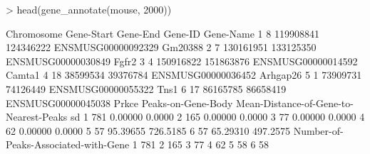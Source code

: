 \documentclass[12pt]{article}
\begin{document}
\begin{Schunk}
\begin{Sinput}
> head(gene_annotate(mouse, 2000))
\end{Sinput}
\begin{Soutput}
  Chromosome Gene-Start  Gene-End            Gene-ID Gene-Name
1          8  119908841 124346222 ENSMUSG00000092329   Gm20388
2          7  130161951 133125350 ENSMUSG00000030849     Fgfr2
3          4  150916822 151863876 ENSMUSG00000014592    Camta1
4         18   38599534  39376784 ENSMUSG00000036452  Arhgap26
5          1   73909731  74126449 ENSMUSG00000055322      Tns1
6         17   86165785  86658419 ENSMUSG00000045038     Prkce
  Peaks-on-Gene-Body Mean-Distance-of-Gene-to-Nearest-Peaks       sd
1                781                                0.00000   0.0000
2                165                                0.00000   0.0000
3                 77                                0.00000   0.0000
4                 62                                0.00000   0.0000
5                 57                               95.39655 726.5185
6                 57                               65.29310 497.2575
  Number-of-Peaks-Associated-with-Gene
1                                  781
2                                  165
3                                   77
4                                   62
5                                   58
6                                   58
\end{Soutput}
\end{Schunk}
\end{document}
